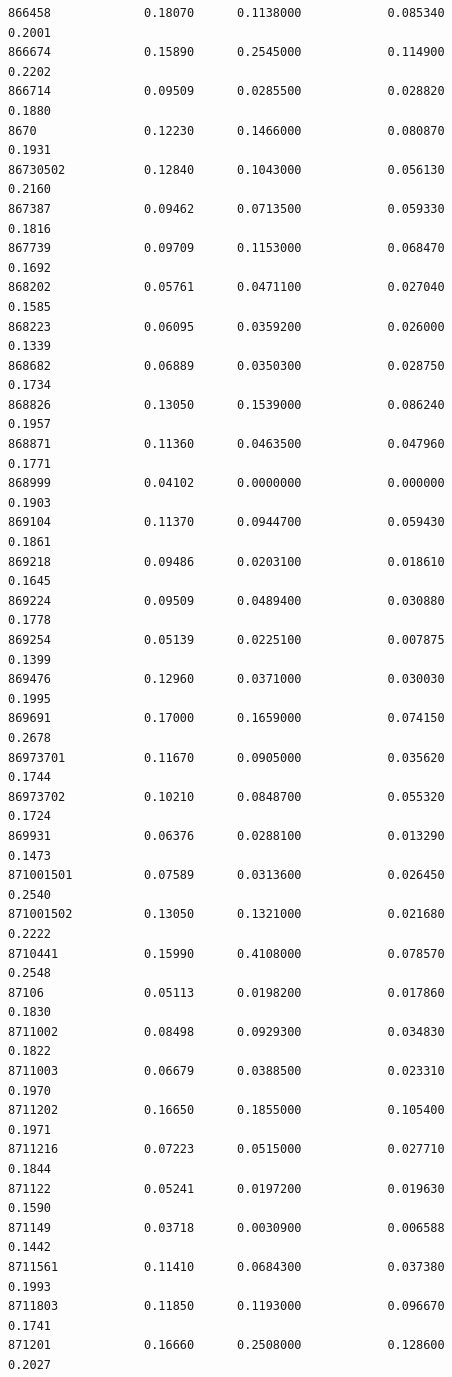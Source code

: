 \documentclass[
  letterpaper,
  DIV=11,
  numbers=noendperiod]{scrartcl}
\begin{document}
\begin{verbatim}
866458             0.18070      0.1138000            0.085340        0.2001
866674             0.15890      0.2545000            0.114900        0.2202
866714             0.09509      0.0285500            0.028820        0.1880
8670               0.12230      0.1466000            0.080870        0.1931
86730502           0.12840      0.1043000            0.056130        0.2160
867387             0.09462      0.0713500            0.059330        0.1816
867739             0.09709      0.1153000            0.068470        0.1692
868202             0.05761      0.0471100            0.027040        0.1585
868223             0.06095      0.0359200            0.026000        0.1339
868682             0.06889      0.0350300            0.028750        0.1734
868826             0.13050      0.1539000            0.086240        0.1957
868871             0.11360      0.0463500            0.047960        0.1771
868999             0.04102      0.0000000            0.000000        0.1903
869104             0.11370      0.0944700            0.059430        0.1861
869218             0.09486      0.0203100            0.018610        0.1645
869224             0.09509      0.0489400            0.030880        0.1778
869254             0.05139      0.0225100            0.007875        0.1399
869476             0.12960      0.0371000            0.030030        0.1995
869691             0.17000      0.1659000            0.074150        0.2678
86973701           0.11670      0.0905000            0.035620        0.1744
86973702           0.10210      0.0848700            0.055320        0.1724
869931             0.06376      0.0288100            0.013290        0.1473
871001501          0.07589      0.0313600            0.026450        0.2540
871001502          0.13050      0.1321000            0.021680        0.2222
8710441            0.15990      0.4108000            0.078570        0.2548
87106              0.05113      0.0198200            0.017860        0.1830
8711002            0.08498      0.0929300            0.034830        0.1822
8711003            0.06679      0.0388500            0.023310        0.1970
8711202            0.16650      0.1855000            0.105400        0.1971
8711216            0.07223      0.0515000            0.027710        0.1844
871122             0.05241      0.0197200            0.019630        0.1590
871149             0.03718      0.0030900            0.006588        0.1442
8711561            0.11410      0.0684300            0.037380        0.1993
8711803            0.11850      0.1193000            0.096670        0.1741
871201             0.16660      0.2508000            0.128600        0.2027

\end{verbatim}
\end{document}
